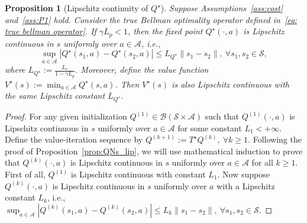 \documentclass[letterpaper, 10 pt, conference]{ieeeconf}  %
\newtheorem{proposition}{Proposition}
\begin{document}
\begin{proposition}[Lipschitz continuity of $Q^\star$]\label{prop: Q lip continuous}
Suppose Assumptions\ \ref{ass:cost} and\ \ref{ass:P1} hold. Consider the true Bellman optimality operator defined in\ \eqref{eq: true bellman operator}.  If $\gamma L_p <1$, then the fixed point $Q^\star(\cdot,a)$ is Lipschitz continuous in $s$ uniformly over $a\in\mathcal A$, i.e.,
\[
\sup_{a \in \mathcal A} |Q^\star(s_1,a)-Q^\star(s_2,a)|\le L_{Q^\star}\|s_1-s_2\|,\ \forall s_1,s_2\in\mathcal S,
\]
where $L_{Q^\star}:=\frac{L_c}{1 - \gamma L_p}$. Moreover, define the value function $V^\star(s):=\min_{a\in\mathcal A}Q^\star(s,a)$. Then $V^\star(s)$ is also Lipschitz continuous with the same Lipschitz constant $L_{Q^\star}$.
\end{proposition}
\begin{proof}
For any given initialization $Q^{(1)} \in \mathcal{B}(\mathcal{S}\times\mathcal{A})$ such that $Q^{(1)}(\cdot,a)$ is Lipschitz continuous in $s$ uniformly over $a \in \mathcal A$ for some constant $L_1<+\infty$. Define the value-iteration sequence by $Q^{(k+1)}:=T^\star Q^{(k)},\ \forall k\ge 1$.
Following the proof of Proposition\ \ref{prop:QNs_lip}, we will use mathematical induction to prove that $Q^{(k)}(\cdot,a)$ is Lipschitz continuous in $s$ uniformly over $a\in \mathcal A$ for all $k\ge 1$. First of all, $Q^{(1)}$ is Lipschitz continuous with constant $L_1$. Now suppose $Q^{(k)}(\cdot,a)$ is Lipschitz continuous in $s$ uniformly over $a$ with a Lipschitz constant $L_k$, i.e., $\sup_{a\in\mathcal A}|Q^{(k)}(s_1,a)-Q^{(k)}(s_2,a)|
\le L_k\|s_1-s_2\|,\ \forall s_1,s_2\in\mathcal S$.



\end{proof}
\end{document}
